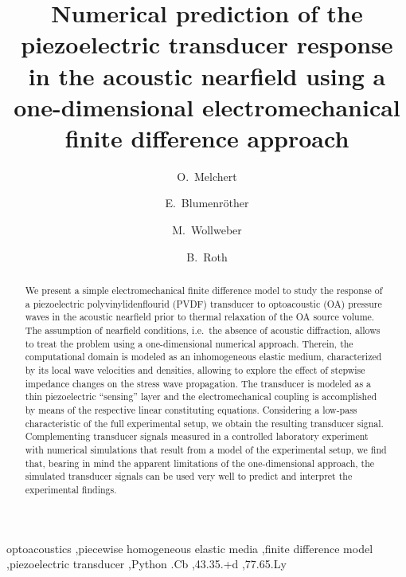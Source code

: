 \documentclass[5p,times,twocolumn]{elsarticle}
\begin{document}
\begin{frontmatter}


\title{Numerical prediction of the piezoelectric transducer response in the
acoustic nearfield using a one-dimensional electromechanical finite difference
approach}

\author{O.\ Melchert} 
%
\author{E.\, Blumenr\"other}
%
\author{M.\, Wollweber}
%
\author{B.\, Roth}
%
\address{Hanover Centre for Optical Technologies (HOT), 
Leibniz Universit\"at Hannover, Nienburger Str.\,17, D-30167 Hannover, Germany}
%

\begin{abstract}
We present a simple electromechanical finite difference model to study the
response of a piezoelectric polyvinylidenflourid (PVDF) transducer to
optoacoustic (OA) pressure waves in the acoustic nearfield prior to thermal
relaxation of the OA source volume. The assumption of nearfield conditions,
i.e.\ the absence of acoustic diffraction, allows to treat the problem using a
one-dimensional numerical approach.  Therein, the computational domain is
modeled as an inhomogeneous elastic medium, characterized by its local wave
velocities and densities, allowing to explore the effect of stepwise impedance
changes on the stress wave propagation.  The transducer is modeled as a thin
piezoelectric ``sensing'' layer and the electromechanical coupling is
accomplished by means of the respective linear constituting equations.
Considering a low-pass characteristic of the full experimental setup, we obtain
the resulting transducer signal.  Complementing transducer signals measured in
a controlled laboratory experiment with numerical simulations that result from
a model of the experimental setup, we find that, bearing in mind the apparent
limitations of the one-dimensional approach, the simulated transducer signals
can be used very well to predict and interpret the experimental findings.
\end{abstract}

\begin{keyword}
optoacoustics \sep piecewise homogeneous elastic media \sep finite difference
model \sep piezoelectric transducer \sep Python
.Cb \sep 43.35.+d \sep 77.65.Ly 
\end{keyword}

\end{frontmatter}
\end{document}

